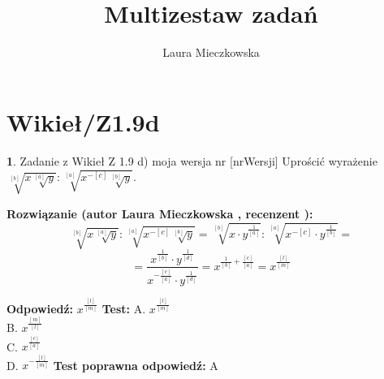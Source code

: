 \documentclass[12pt, a4paper]{article}
\title{Multizestaw zadań}
\author{Laura Mieczkowska}
\date{}
\theoremstyle{definition} %
\newtheorem{zad}{}
\newcommand{\kategoria}[1]{\section{#1}} %
\newcommand{\zadStart}[1]{\begin{zad}#1\newline} %
\newcommand{\zadStop}{\end{zad}}   %
\newcommand{\rozwStart}[2]{\noindent \textbf{Rozwiązanie (autor #1 , recenzent #2): }\newline} %
\newcommand{\odpStart}{\noindent \textbf{Odpowiedź:}\newline}    %
\newcommand{\odpStop}{\newline}                                             %
\newcommand{\testStart}{\noindent \textbf{Test:}\newline} %
\newcommand{\testStop}{\newline} %
\newcommand{\kluczStart}{\noindent \textbf{Test poprawna odpowiedź:}\newline} %
\newcommand{\kluczStop}{\newline} %
\begin{document}
\maketitle


\kategoria{Wikieł/Z1.9d}
\zadStart{Zadanie z Wikieł Z 1.9 d) moja wersja nr [nrWersji]}
Uprościć wyrażenie $\sqrt[{[b]}]{x\sqrt[{[a]}]{y}}:\sqrt[{[a]}]{x^{-[c]}\sqrt[{[b]}]{y}}$.
\zadStop
\rozwStart{Laura Mieczkowska}{}
$$\sqrt[{[b]}]{x\sqrt[{[a]}]{y}}:\sqrt[{[a]}]{x^{-[c]}\sqrt[{[b]}]{y}}=
\sqrt[{[b]}]{x\cdot y^{\frac{1}{[a]}}}:\sqrt[{[a]}]{x^{-[c]}\cdot y^{\frac{1}{[b]}}}=$$
$$=\frac{x^{\frac{1}{[b]}}\cdot y^{\frac{1}{[d]}}}{x^{-\frac{[c]}{[a]}}\cdot y^{\frac{1}{[d]}}}=
x^{\frac{1}{[b]}+\frac{[c]}{[a]}}=x^{\frac{[l]}{[m]}}$$

\odpStart
$x^{\frac{[l]}{[m]}}$
\odpStop
\testStart
A. $x^{\frac{[l]}{[m]}}$ \\
B. $x^{\frac{[m]}{[l]}}$ \\
C. $x^{\frac{[c]}{[a]}}$ \\
D. $x^{-\frac{[l]}{[m]}}$ 
\testStop
\kluczStart
A
\kluczStop
\end{document}
